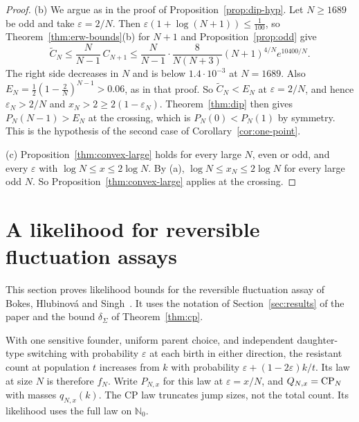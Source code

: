 \begin{proof}
(b) We argue as in the proof of Proposition~\ref{prop:dip-hyp}. Let $N\ge1689$ be odd and take
$\varepsilon=2/N$. Then $\varepsilon(1+\log(N+1))\le\frac1{100}$, so
Theorem~\ref{thm:erw-bounds}(b) for $N+1$ and Proposition~\ref{prop:odd} give
\[
 \widetilde C_N\le\frac N{N-1}\,C_{N+1}\le\frac N{N-1}\cdot\frac8{N(N+3)}(N+1)^{4/N}e^{10400/N}.
\]
The right side decreases in $N$ and is below $1.4\cdot10^{-3}$ at $N=1689$. Also
$E_N=\frac12(1-\frac2N)^{N-1}>0.06$, as in that proof. So $\widetilde C_N<E_N$ at
$\varepsilon=2/N$, and hence $\varepsilon_N>2/N$ and $x_N>2\ge2(1-\varepsilon_N)$.
Theorem~\ref{thm:dip} then gives $P_N(N-1)>E_N$ at the crossing, which is $P_N(0)<P_N(1)$ by
symmetry. This is the hypothesis of the second case of Corollary~\ref{cor:one-point}.

(c) Proposition~\ref{thm:convex-large} holds for every large $N$, even or odd, and every
$\varepsilon$ with $\log N\le x\le2\log N$. By (a), $\log N\le x_N\le2\log N$ for every large
odd $N$. So Proposition~\ref{thm:convex-large} applies at the crossing.
\end{proof}

\section{A likelihood for reversible fluctuation assays}\label{or:likelihood}

This section proves likelihood bounds for the reversible fluctuation
assay of Bokes, Hlubinov\'a and Singh~\cite{bhs2023}. It uses the notation of
Section~\ref{sec:results} of the paper and the bound $\delta_\Sigma$ of
Theorem~\ref{thm:cp}.

With one sensitive founder, uniform parent choice, and independent
daughter-type switching with probability $\varepsilon$ at each birth in
either direction, the resistant count at population $t$ increases from
$k$ with probability $\varepsilon+(1-2\varepsilon)k/t$. Its law at size
$N$ is therefore $f_N$. Write $P_{N,x}$ for this law at
$\varepsilon=x/N$, and $Q_{N,x}=\mathrm{CP}_N$ with masses $q_{N,x}(k)$.
The CP law truncates jump sizes, not the total count. Its likelihood
uses the full law on $\mathbb N_0$.


